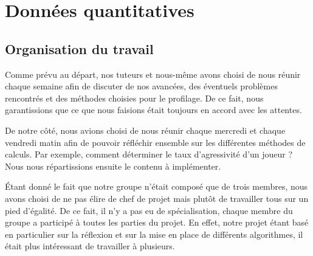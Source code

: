 \documentclass{report}
\begin{document}
\chapter{Données quantitatives}

\section{Organisation du travail}
\hspace{0.5cm}Comme prévu au départ, nos tuteurs et nous-même avons choisi de nous réunir chaque semaine afin de discuter de nos avancées, des éventuels problèmes rencontrés et des méthodes choisies pour le profilage. De ce fait, nous garantissions que ce que nous faisions était toujours en accord avec les attentes.\par
De notre côté, nous avions choisi de nous réunir chaque mercredi et chaque vendredi matin afin de pouvoir réfléchir ensemble sur les différentes méthodes de calculs. Par exemple, comment déterminer le taux d'agressivité d'un joueur ? Nous nous répartissions ensuite le contenu à implémenter.\par
Étant donné le fait que notre groupe n'était composé que de trois membres, nous avons choisi de ne pas élire de chef de projet mais plutôt de travailler tous sur un pied d'égalité. De ce fait, il n'y a pas eu de spécialisation, chaque membre du groupe a participé à toutes les parties du projet. En effet, notre projet étant basé en particulier sur la réflexion et sur la mise en place de différents algorithmes, il était plus intéressant de travailler à plusieurs.\par
\end{document}
